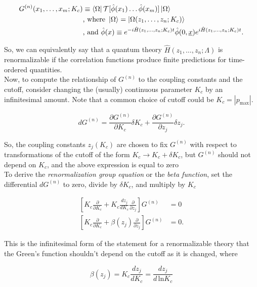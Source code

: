 \begin{align}
G^{(n)}(x_1, \dots, x_m; K_c) &\equiv \bra{\Omega} \mathcal{T} [\hat{\phi}(x_1) \dots \hat{\phi} (x_m) ] \ket{\Omega} \\
&\text{, where } \ket{\Omega} = \ket{\Omega(z_1, \dots , z_n; K_c)} \\
&\text{, and } \hat{\phi}(x) \equiv e^{-i \hat{H}(z_1, \dots, z_n; K_c)t} \hat{\phi}(0,\underline{x}) e^{i \hat{H}(z_1, \dots , z_n; K_c)t}.
\end{align}

\noindent So, we can equivalently say that a quantum theory $\hat{H}(z_1, \dots, z_n; \Lambda)$ is renormalizable if the correlation functions produce finite predictions for time-ordered quantities. \\

\noindent Now, to compute the relationship of $G^{(n)}$ to the coupling constants and the cutoff, consider changing the (usually) continuous parameter $K_c$ by an infinitesimal amount. Note that a common choice of cutoff could be $K_c = | p_{\text{max}} |$.

\begin{equation}
dG^{(n)} = \frac{\partial G^{(n)}}{\partial K_c} \delta K_c + \frac{\partial G^{(n)}}{\partial z_j} \delta z_j .
\end{equation}

\noindent So, the coupling constants $z_j (K_c)$ are chosen to fix $G^{(n)}$ with respect to transformations of the cutoff of the form $K_c \rightarrow K_c + \delta K_c$, but $G^{(n)}$ should not depend on $K_c$, and the above expression is equal to zero \\

\noindent To derive the \textit{renormalization group equation} or the \textit{beta function}, set the differential $dG^{(n)}$ to zero, divide by $\delta K_c$, and multiply by $K_c$

\begin{align}
\left[ K_c \frac{\partial}{\partial K_c} + K_c \frac{d z_j}{d K_c} \frac{\partial}{\partial z_j} \right] G^{(n)}&= 0 \\
\left[ K_c \frac{\partial}{\partial K_c} + \beta(z_j) \frac{\partial}{\partial z_j} \right] G^{(n)} &= 0 .
\end{align}

\noindent This is the infinitesimal form of the statement for a renormalizable theory that the Green's function shouldn't depend on the cutoff as it is changed, where 

\begin{equation}
\beta(z_j) = K_c \frac{d z_j}{d K_c} = \frac{d z_j}{d \, \text{ln} K_c}
\end{equation} 

